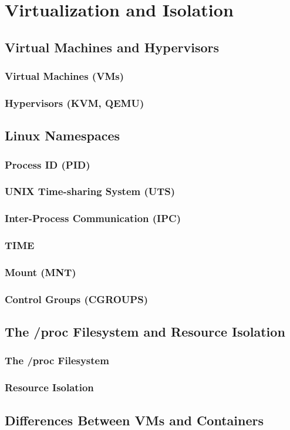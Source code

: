 \chapter{Virtualization and Isolation}

\section{Virtual Machines and Hypervisors}

    \subsection{Virtual Machines (VMs)}
    \subsection{Hypervisors (KVM, QEMU)}

\section{Linux Namespaces}

    \subsection{Process ID (PID)}
    \subsection{UNIX Time-sharing System (UTS)}
    \subsection{Inter-Process Communication (IPC)}
    \subsection{TIME}
    \subsection{Mount (MNT)}
    \subsection{Control Groups (CGROUPS)}


\section{The /proc Filesystem and Resource Isolation}

    \subsection{The /proc Filesystem}
    \subsection{Resource Isolation}

\section{Differences Between VMs and Containers}